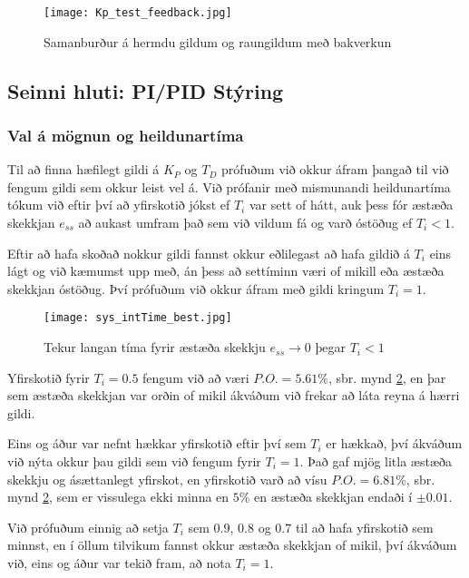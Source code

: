 \documentclass[12pt,final]{rureport}
\begin{document}
	\begin{figure}[]
		\centering
		\texttt{[image: Kp\_test\_feedback.jpg]}
		\caption{Samanburður á hermdu gildum og raungildum með bakverkun}
		\label{fig:feedback}
	\end{figure}
	
	\subsection{Seinni hluti: PI/PID Stýring}
	\subsubsection{Val á mögnun og heildunartíma}
	Til að finna hæfilegt gildi á $K_P$ og $T_D$ prófuðum við okkur áfram þangað til við fengum gildi sem okkur leist vel á.
	Við prófanir með mismunandi heildunartíma tókum við eftir því að yfirskotið jókst ef $T_i$ var sett of hátt, auk þess fór æstæða skekkjan $e_{ss}$ að aukast umfram það sem við vildum fá og varð óstöðug ef $T_i < 1$.
	
	Eftir að hafa skoðað nokkur gildi fannst okkur eðlilegast að hafa gildið á $T_i$ eins lágt og við kæmumst upp með, án þess að settíminn væri of mikill eða æstæða skekkjan óstöðug. Því prófuðum við okkur áfram með gildi kringum $T_i = 1$.
	
	\begin{figure}[h!]
		\centering
		\texttt{[image: sys\_intTime\_best.jpg]}
		\caption{Tekur langan tíma fyrir æstæða skekkju $e_{ss} \rightarrow 0$ þegar $T_i < 1$}
		\label{fig:intTime}
	\end{figure}
	
	Yfirskotið fyrir $T_i = 0.5$ fengum við að væri $P.O. = 5.61\%$, sbr. mynd \ref{fig:intTime}, en þar sem æstæða skekkjan var orðin of mikil ákváðum við frekar að láta reyna á hærri gildi. 
	
	Eins og áður var nefnt hækkar yfirskotið eftir því sem $T_i$ er hækkað, því ákváðum við nýta okkur þau gildi sem við fengum fyrir $T_i = 1$. Það gaf mjög litla æstæða skekkju og ásættanlegt yfirskot, en yfirskotið varð að vísu $P.O. = 6.81\%$, sbr. mynd \ref{fig:intTime}, sem er vissulega ekki minna en $5\%$ en æstæða skekkjan endaði í $\pm 0.01$.
	
	Við prófuðum einnig að setja $T_i$ sem $0.9$, $0.8$ og $0.7$ til að hafa yfirskotið sem minnst, en í öllum tilvikum fannst okkur æstæða skekkjan of mikil, því ákváðum við, eins og áður var tekið fram, að nota $T_i = 1$.
	
\end{document}
